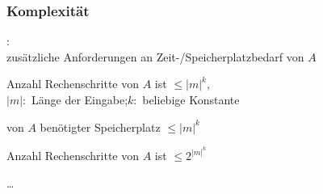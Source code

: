     \begin{frame}
      \frametitle{Komplexität}
      
      \begin{center}
      \end{center}

      :\\
      zusätzliche Anforderungen an Zeit-/Speicherplatzbedarf von $A$%
      \begin{Itemize}
        \item<2->
          Anzahl Rechenschritte von $A$ ist $\leqslant |m|^k$,\\
          $|m|:$ Länge der Eingabe;\quad $k:$ beliebige Konstante
          \par\smallskip
        \item<3->
          von $A$ benötigter Speicherplatz $\leqslant |m|^k$
          \par\smallskip
        \item<4->
          Anzahl Rechenschritte von $A$ ist $\leqslant 2^{|m|^k}$
          \par\smallskip
        \item<5->
          \dots
      \end{Itemize}
    \end{frame}

